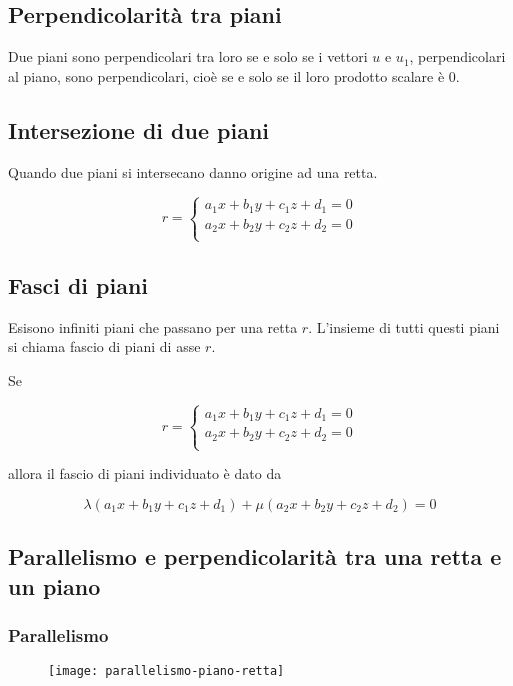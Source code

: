 \subsection{Perpendicolarità tra piani}

Due piani sono perpendicolari tra loro se e solo se i vettori $u$ e $u_1$, perpendicolari al piano, sono perpendicolari, cioè se e solo se il loro prodotto scalare è 0.

\subsection{Intersezione di due piani}

Quando due piani si intersecano danno origine ad una retta.

$$
r =
\begin{cases}
a_1x+b_1y+c_1z+d_1 = 0 \\
a_2x+b_2y+c_2z+d_2 = 0 \\
\end{cases}
$$

\subsection{Fasci di piani}

Esisono infiniti piani che passano per una retta $r$. L'insieme di tutti questi piani si chiama fascio di piani di asse $r$.

Se

$$
r =
\begin{cases}
a_1x+b_1y+c_1z+d_1 = 0 \\
a_2x+b_2y+c_2z+d_2 = 0 \\
\end{cases}
$$

allora il fascio di piani individuato è dato da

$$
\lambda(a_1x+b_1y+c_1z+d_1) + \mu (a_2x+b_2y+c_2z+d_2) = 0
$$


\subsection{Parallelismo e perpendicolarità tra una retta e un piano}

\subsubsection{Parallelismo}

\begin{figure}[H]
\texttt{[image: parallelismo-piano-retta]}
\centering
\end{figure}

